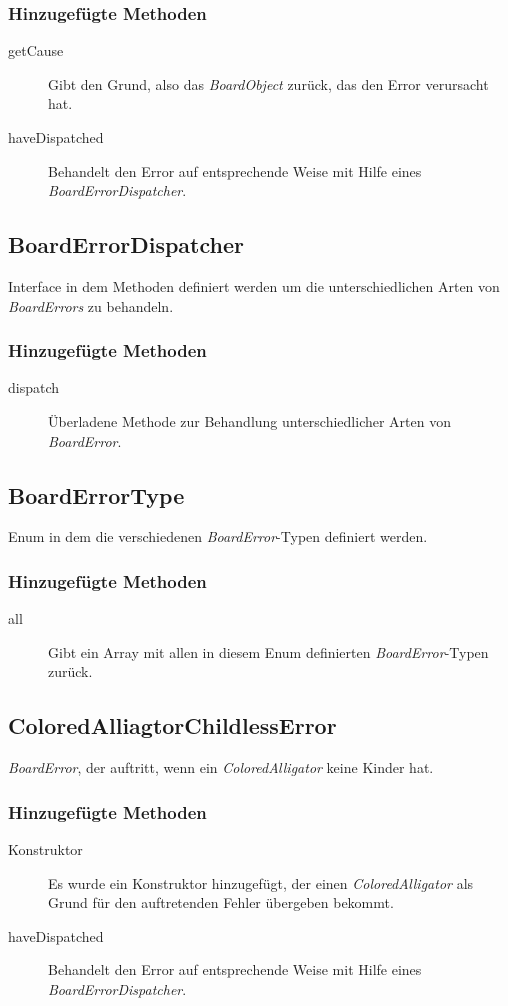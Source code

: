 	\subsubsection{Hinzugefügte Methoden}
	\begin{description}
		\item[getCause]
			Gibt den Grund, also das \emph{BoardObject} zurück, das den Error verursacht hat.
		\item[haveDispatched]
			Behandelt den Error auf entsprechende Weise mit Hilfe eines \emph{BoardErrorDispatcher}.
	\end{description}

\subsection{BoardErrorDispatcher}
	Interface in dem Methoden definiert werden um die unterschiedlichen Arten von \emph{BoardErrors} zu behandeln.
	\subsubsection{Hinzugefügte Methoden}
	\begin{description}
		\item[dispatch]
			Überladene Methode zur Behandlung unterschiedlicher Arten von \emph{BoardError}.
	\end{description}

\subsection{BoardErrorType}
	Enum in dem die verschiedenen \emph{BoardError}-Typen definiert werden.
	\subsubsection{Hinzugefügte Methoden}
	\begin{description}
		\item[all]
			Gibt ein Array mit allen in diesem Enum definierten \emph{BoardError}-Typen zurück.
	\end{description}

\subsection{ColoredAlliagtorChildlessError}
	\emph{BoardError}, der auftritt, wenn ein \emph{ColoredAlligator} keine Kinder hat.
	\subsubsection{Hinzugefügte Methoden}
	\begin{description}
		\item[Konstruktor] Es wurde ein Konstruktor hinzugefügt, der einen \emph{ColoredAlligator} als Grund für den 
			auftretenden Fehler übergeben bekommt.
		\item[haveDispatched]
			Behandelt den Error auf entsprechende Weise mit Hilfe eines \emph{BoardErrorDispatcher}.
	\end{description}

